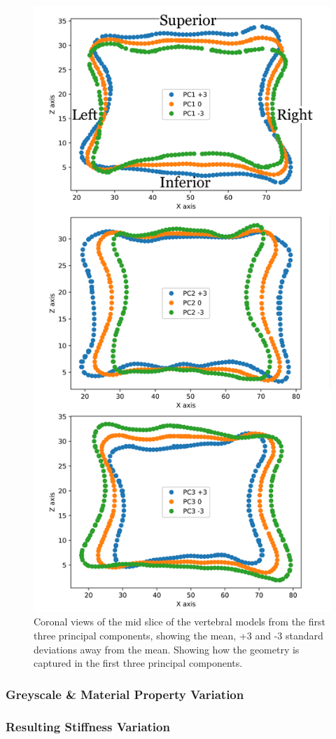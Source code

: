 \begin{figure}[p]
  \centering
  \includegraphics[width=.65\textwidth]{Chapters/Chapter_PCA_images/PC1_2_3_CoronalSlice.pdf}
  \caption{Coronal views of the mid slice of the vertebral models from the first three principal components, showing the mean, +3 and -3 standard deviations away from the mean. Showing how the geometry is captured in the first three principal components.}
  \label{fig:PC1_2_3_CoronalSlice}
\end{figure}

\pagebreak



\subsubsection{Greyscale \& Material Property Variation}

\subsubsection{Resulting Stiffness Variation}

